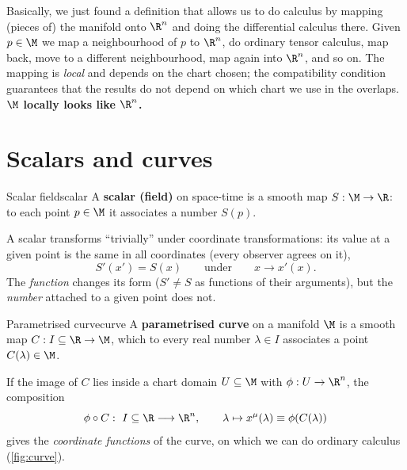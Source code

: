 \begin{remarkbox}
Basically, we just found a definition that allows us to do calculus by mapping (pieces of) the manifold onto $\R^n$ and doing the differential calculus there. Given $p\in\M$ we map a neighbourhood of $p$ to $\R^n$, do ordinary tensor calculus, map back, move to a different neighbourhood, map again into $\R^n$, and so on. The mapping is \emph{local} and depends on the chart chosen; the compatibility condition guarantees that the results do not depend on which chart we use in the overlaps. \textbf{$\M$ locally looks like $\R^n$.}
\end{remarkbox}

\section{Scalars and curves}

\begin{definition}{Scalar field}{scalar}
A \textbf{scalar (field)} on space-time is a smooth map $S:\M\to\R$: to each point $p\in\M$ it associates a number $S(p)$.
\end{definition}
A scalar transforms ``trivially'' under coordinate transformations: its value at a given point is the same in all coordinates (every observer agrees on it),
\begin{equation}
  S'(x')=S(x)\qquad\text{under}\qquad x\to x'(x).
\end{equation}
The \emph{function} changes its form ($S'\neq S$ as functions of their arguments), but the \emph{number} attached to a given point does not.

\begin{definition}{Parametrised curve}{curve}
A \textbf{parametrised curve} on a manifold $\M$ is a smooth map $C:I\subseteq\R\to\M$, which to every real number $\lambda\in I$ associates a point $C(\lambda)\in\M$.
\end{definition}
If the image of $C$ lies inside a chart domain $U\subseteq\M$ with $\phi:U\to\R^n$, the composition
\begin{equation}
  \phi\circ C:\ I\subseteq\R\longrightarrow\R^n,\qquad \lambda\mapsto x^\mu(\lambda)\equiv\phi(C(\lambda))
\end{equation}
gives the \emph{coordinate functions} of the curve, on which we can do ordinary calculus (\cref{fig:curve}).

